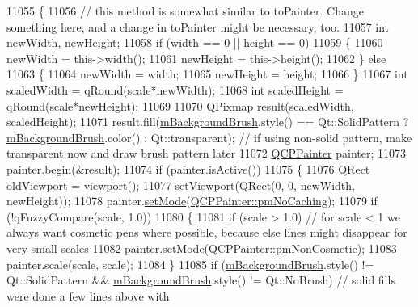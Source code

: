 \begin{DoxyCode}
11055 \{
11056   \textcolor{comment}{// this method is somewhat similar to toPainter. Change something here, and a change in toPainter might
       be necessary, too.}
11057   \textcolor{keywordtype}{int} newWidth, newHeight;
11058   \textcolor{keywordflow}{if} (width == 0 || height == 0)
11059   \{
11060     newWidth = this->width();
11061     newHeight = this->height();
11062   \} \textcolor{keywordflow}{else}
11063   \{
11064     newWidth = width;
11065     newHeight = height;
11066   \}
11067   \textcolor{keywordtype}{int} scaledWidth = qRound(scale*newWidth);
11068   \textcolor{keywordtype}{int} scaledHeight = qRound(scale*newHeight);
11069 
11070   QPixmap result(scaledWidth, scaledHeight);
11071   result.fill(\hyperlink{class_q_custom_plot_a3aef5de4ac012178e3293248e9c63737}{mBackgroundBrush}.style() == Qt::SolidPattern ? 
      \hyperlink{class_q_custom_plot_a3aef5de4ac012178e3293248e9c63737}{mBackgroundBrush}.color() : Qt::transparent); \textcolor{comment}{// if using non-solid pattern, make
       transparent now and draw brush pattern later}
11072   \hyperlink{class_q_c_p_painter}{QCPPainter} painter;
11073   painter.\hyperlink{class_q_c_p_painter_a0a41146ccd619dceab6e25ec7b46b044}{begin}(&result);
11074   \textcolor{keywordflow}{if} (painter.isActive())
11075   \{
11076     QRect oldViewport = \hyperlink{class_q_custom_plot_a953ecdbc28018e7e84cb6213ad3d88c2}{viewport}();
11077     \hyperlink{class_q_custom_plot_a3f9bc4b939dd8aaba9339fd09f273fc4}{setViewport}(QRect(0, 0, newWidth, newHeight));
11078     painter.\hyperlink{class_q_c_p_painter_af6b1f7d2bbc548b10aa55d8b6ad49577}{setMode}(\hyperlink{class_q_c_p_painter_a156cf16444ff5e0d81a73c615fdb156dae78f9a4eb277a5f9207f50850a51a0b0}{QCPPainter::pmNoCaching});
11079     \textcolor{keywordflow}{if} (!qFuzzyCompare(scale, 1.0))
11080     \{
11081       \textcolor{keywordflow}{if} (scale > 1.0) \textcolor{comment}{// for scale < 1 we always want cosmetic pens where possible, because else lines
       might disappear for very small scales}
11082         painter.\hyperlink{class_q_c_p_painter_af6b1f7d2bbc548b10aa55d8b6ad49577}{setMode}(\hyperlink{class_q_c_p_painter_a156cf16444ff5e0d81a73c615fdb156dac1e481bfaf408f2bd2eaad3ec341f36b}{QCPPainter::pmNonCosmetic});
11083       painter.scale(scale, scale);
11084     \}
11085     \textcolor{keywordflow}{if} (\hyperlink{class_q_custom_plot_a3aef5de4ac012178e3293248e9c63737}{mBackgroundBrush}.style() != Qt::SolidPattern && 
      \hyperlink{class_q_custom_plot_a3aef5de4ac012178e3293248e9c63737}{mBackgroundBrush}.style() != Qt::NoBrush) \textcolor{comment}{// solid fills were done a few lines above with
}
\end{DoxyCode}
